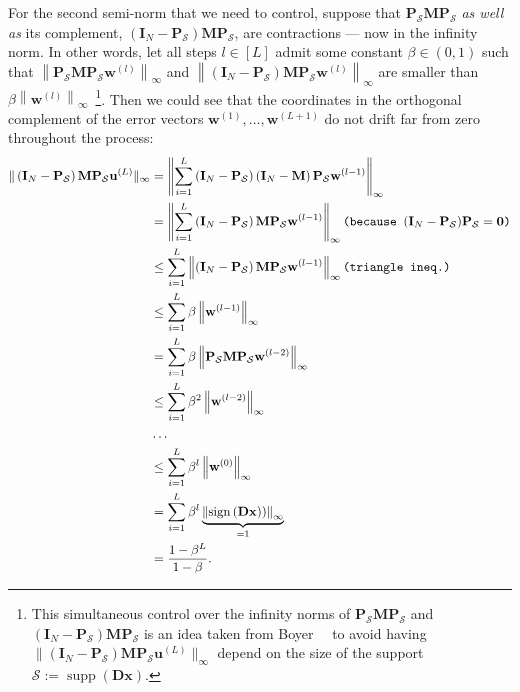For the second semi-norm that we need to control, suppose that $\mathbf{P}_\mathcal{S} \mathbf{M} \mathbf{P}_\mathcal{S}$ \emph{as well as} its complement, $\left(\mathbf{I}_N - \mathbf{P}_\mathcal{S}\right) \mathbf{M} \mathbf{P}_\mathcal{S}$, are contractions --- now in the infinity norm. In other words, let all steps $l \in [L]$ admit some constant $\beta \in (0,1)$ such that $\left \| \mathbf{P}_\mathcal{S} \mathbf{M} \mathbf{P}_\mathcal{S} \mathbf{w}^{(l)} \right \|_{\infty}$ and $\left \| \left(\mathbf{I}_N - \mathbf{P}_\mathcal{S}\right) \mathbf{M} \mathbf{P}_\mathcal{S} \mathbf{w}^{(l)} \right \|_{\infty}$ are smaller than $\beta \left \| \mathbf{w}^{(l)} \right \|_{\infty}$~\footnote{This simultaneous control over the infinity norms of $\mathbf{P}_\mathcal{S} \mathbf{M} \mathbf{P}_\mathcal{S}$ and $\left(\mathbf{I}_N - \mathbf{P}_\mathcal{S}\right) \mathbf{M} \mathbf{P}_\mathcal{S}$ is an idea taken from Boyer~\etal~\cite{boyer2019} to avoid having $\| \left(\mathbf{I}_N - \mathbf{P}_\mathcal{S}\right) \mathbf{M} \mathbf{P}_\mathcal{S} \mathbf{u}^{(L)} \|_\infty$ depend on the size of the support $\mathcal{S} := \operatorname{supp}\left ( \mathbf{Dx} \right )$.}. Then we could see that the coordinates in the orthogonal complement of the error vectors $\mathbf{w}^{(1)}, \dots, \mathbf{w}^{(L+1)}$ do not drift far from zero throughout the process:
\begingroup
\allowdisplaybreaks
\begin{align}
    \| \left(\mathbf{I}_N - \mathbf{P}_\mathcal{S}\right) \mathbf{M} \mathbf{P}_\mathcal{S} \mathbf{u}^{(L)} \|_\infty & = \left \| \sum_{i=1}^{L} \left(\mathbf{I}_N - \mathbf{P}_\mathcal{S}\right) \left(\mathbf{I}_N - \mathbf{M}\right) \mathbf{P}_{\mathcal{S}} \mathbf{w}^{(l-1)} \right \|_{\infty} \nonumber \\
    & = \left \| \sum_{i=1}^{L} \left(\mathbf{I}_N - \mathbf{P}_\mathcal{S}\right) \mathbf{M} \mathbf{P}_{\mathcal{S}} \mathbf{w}^{(l-1)} \right \|_{\infty} \nonumber \texttt{(because $(\mathbf{I}_N - \mathbf{P}_\mathcal{S})\mathbf{P}_\mathcal{S} = \mathbf{0}$)} \\
    & \leq \sum_{i=1}^{L} \left \| \left(\mathbf{I}_N - \mathbf{P}_\mathcal{S}\right) \mathbf{M} \mathbf{P}_{\mathcal{S}} \mathbf{w}^{(l-1)} \right \|_{\infty} \nonumber \texttt{(triangle ineq.)} \\
    & \leq \sum_{i=1}^{L} \beta \left \| \mathbf{w}^{(l-1)} \right \|_{\infty} \nonumber \\
    & = \sum_{i=1}^{L} \beta \left \| \mathbf{P}_\mathcal{S} \mathbf{M} \mathbf{P}_\mathcal{S} \mathbf{w}^{(l-2)} \right \|_{\infty} \nonumber \\
    & \leq \sum_{i=1}^{L} \beta^2 \left \| \mathbf{w}^{(l-2)} \right \|_{\infty} \nonumber \\
    & \dots \nonumber \\
    & \leq \sum_{i=1}^{L} \beta^l \left \| \mathbf{w}^{(0)} \right \|_{\infty} \nonumber \\
    & = \sum_{i=1}^{L} \beta^l \underbrace{\left \| \operatorname{sign} \left ( \mathbf{Dx} \right ) ) \right \|_{\infty}}_{=1} \nonumber \\
    & = \frac{1 - \beta^L}{1 - \beta}\label{eq:golf_bound_off_support}.
\end{align}
